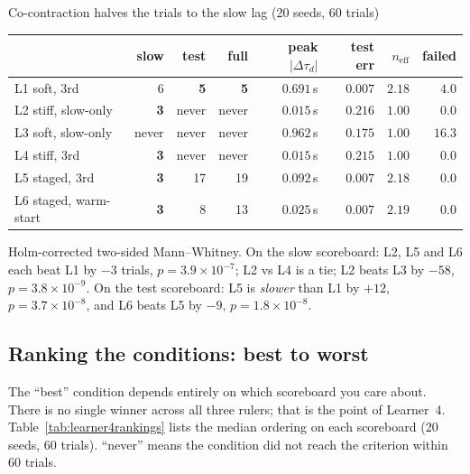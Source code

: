 \documentclass[11pt,a4paper]{article}
\newcommand{\neff}{n_{\mathrm{eff}}}
\begin{document}
\begin{resultbox}{Co-contraction halves the trials to the slow lag (20 seeds, 60 trials)}
\begin{center}
\small
\begin{tabular}{@{}lrrrrrrr@{}}
\toprule
 & slow & test & full & peak $|\Delta\tau_d|$ & test err & $\neff$ & failed \\
\midrule
L1 soft, 3rd          & 6     & \textbf{5} & \textbf{5} & $0.691$\,s & $0.007$ & $2.18$ & $4.0$ \\
L2 stiff, slow-only   & \textbf{3} & never & never & $0.015$\,s & $0.216$ & $1.00$ & $0.0$ \\
L3 soft, slow-only    & never & never & never & $0.962$\,s & $0.175$ & $1.00$ & $16.3$ \\
L4 stiff, 3rd         & \textbf{3} & never & never & $0.015$\,s & $0.215$ & $1.00$ & $0.0$ \\
L5 staged, 3rd        & \textbf{3} & 17 & 19 & $0.092$\,s & $0.007$ & $2.18$ & $0.0$ \\
L6 staged, warm-start & \textbf{3} & 8 & 13 & $0.025$\,s & $0.007$ & $2.19$ & $0.0$ \\
\bottomrule
\end{tabular}
\end{center}

Holm-corrected two-sided Mann--Whitney. On the slow scoreboard: L2, L5 and
L6 each beat L1 by $-3$ trials, $p=3.9\times10^{-7}$; L2 vs L4 is a tie;
L2 beats L3 by $-58$, $p=3.8\times10^{-9}$. On the test scoreboard: L5 is
\emph{slower} than L1 by $+12$, $p=3.7\times10^{-8}$, and L6 beats L5 by
$-9$, $p=1.8\times10^{-8}$.
\end{resultbox}

\subsection{Ranking the conditions: best to worst}
\label{sec:learner4rankings}

The ``best'' condition depends entirely on which scoreboard you care about.
There is no single winner across all three rulers; that is the point of
Learner~4.  Table~\ref{tab:learner4rankings} lists the median ordering on
each scoreboard (20 seeds, 60 trials).  ``never'' means the condition did
not reach the criterion within 60 trials.
\end{document}
